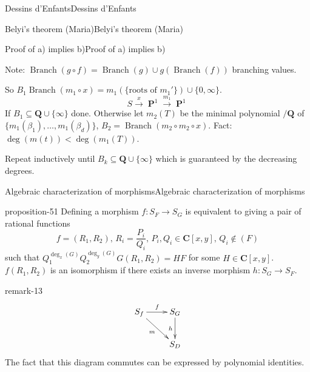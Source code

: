 \documentclass[10pt,]{book}
\numberwithin{equation}{section}
\newcommand{\lb}{[}
\newcommand{\rb}{]}
\newcommand{\QQ}{\mathbf{Q}}
\newcommand{\CC}{\mathbf{C}}
\DeclareMathOperator{\PP}{\mathbf{P}}
\newcommand{\lt}{<}
\begin{document}
\begin{chapterptx}{Dessins d'Enfants}{}{Dessins d'Enfants}{}{}
\begin{sectionptx}{Belyi's theorem (Maria)}{}{Belyi's theorem (Maria)}{}{}
\begin{subsectionptx}{Proof of a) implies b)}{}{Proof of a) implies b)}{}{}
\par
\hypertarget{p-606}{}%
Note: \(\operatorname{Branch}(g\circ f) = \operatorname{Branch}(g) \cup g(\operatorname{Branch}(f))\) branching values.%
\par
\hypertarget{p-607}{}%
So \(B_1 \operatorname{Branch}(m_1 \circ x) = m_1(\{\text{roots of }m_1'\}) \cup\{0,\infty\}\).%
\begin{equation*}
S\xrightarrow x \PP^1 \xrightarrow{m_1} \PP^1
\end{equation*}
If \(B_1 \subseteq \QQ \cup \{\infty\}\) done. Otherwise let \(m_2(T) \) be the minimal polynomial \(/\QQ\) of \(\{m_1(\beta_1) ,\ldots, m_1(\beta_d) \}\), \(B_2 = \operatorname{Branch}(m_2\circ m_2 \circ x)\). Fact: \(\deg(m(t)) \lt \deg(m_1(T))\).%
\par
\hypertarget{p-608}{}%
Repeat inductively until \(B_k \subseteq \QQ \cup \{\infty\}\) which is guaranteed by the decreasing degrees.%
\end{subsectionptx}
%
%
\typeout{************************************************}
\typeout{************************************************}
%
\begin{subsectionptx}{Algebraic characterization of morphisms}{}{Algebraic characterization of morphisms}{}{}\label{subsection-55}
\begin{proposition}{}{}{proposition-51}%
\hypertarget{p-609}{}%
Defining a morphism \(f \colon S_F\to S_G\) is equivalent to giving a pair of rational functions%
\begin{equation*}
f=  (R_1, R_2),\,R_i= \frac{P_i}{Q_i},\,    P_i,Q_i\in \CC[x,y],\,Q_i\not\in (F)
\end{equation*}
such that \(Q_1^{\deg_x(G)}Q_2^{\deg_y(G)} G(R_1, R_2) = HF\) for some \(H \in \CC\lb x, y\rb\). \(f(R_1, R_2)\) is an isomorphism if there exists an inverse morphism \(h\colon S_G\to S_F\).%
\end{proposition}
\begin{remark}{}{remark-13}%
\hypertarget{p-610}{}%
%
\begin{equation*}
\xymatrix{
S_f \ar[r]^f \ar[dr]_m & S_G \ar[d]_h \\
& S_D
}
\end{equation*}
The fact that this diagram commutes can be expressed by polynomial identities.%
\end{remark}
\end{subsectionptx}
%
%
\typeout{************************************************}

\end{sectionptx}
\end{chapterptx}
\end{document}
